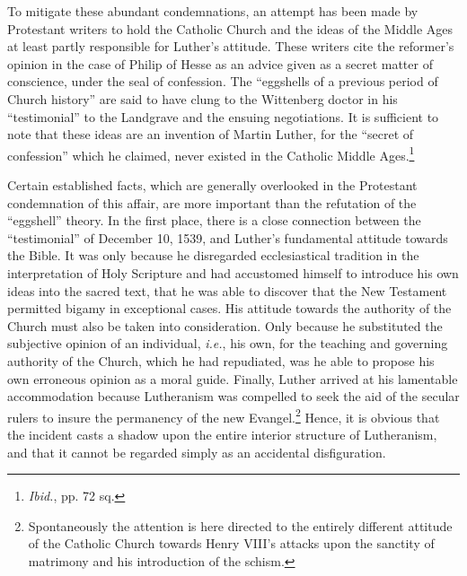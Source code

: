 To mitigate these abundant condemnations, an attempt has been
made by Protestant writers to hold the Catholic Church and the ideas
of the Middle Ages at least partly responsible for Luther’s attitude.
These writers cite the reformer’s opinion in the case of Philip of Hesse
as an advice given as a secret matter of conscience, under the seal of
confession. The “eggshells of a previous period of Church history”
are said to have clung to the Wittenberg doctor in his “testimonial”
to the Landgrave and the ensuing negotiations. It is sufficient to note
that these ideas are an invention of Martin Luther, for the “secret
of confession” which he claimed, never existed in the Catholic Middle
Ages.\footnote{\textit{Ibid.}, pp. 72 sq.}

Certain established facts, which are generally overlooked in the
Protestant condemnation of this affair, are more important than the
refutation of the “eggshell” theory. In the first place, there is a close
connection between the “testimonial” of December 10, 1539, and
Luther’s fundamental attitude towards the Bible. It was only because
he disregarded ecclesiastical tradition in the interpretation of Holy
Scripture and had accustomed himself to introduce his own ideas into
the sacred text, that he was able to discover that the New Testament
permitted bigamy in exceptional cases. His attitude towards the authority
of the Church must also be taken into consideration. Only
because he substituted the subjective opinion of an individual, \textit{i.e.},
his own, for the teaching and governing authority of the Church,
which he had repudiated, was he able to propose his own erroneous
opinion as a moral guide. Finally, Luther arrived at his lamentable
accommodation because Lutheranism was compelled to seek the aid
of the secular rulers to insure the permanency of the new Evangel.\footnote
{Spontaneously the attention is here directed to the entirely different attitude of the
Catholic Church towards Henry VIII’s attacks upon the sanctity of matrimony and his
introduction of the schism.}
Hence, it is obvious that the incident casts a shadow upon the entire
interior structure of Lutheranism, and that it cannot be regarded
simply as an accidental disfiguration.
